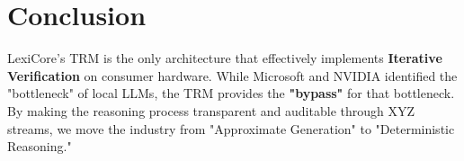 \documentclass[11pt]{article}
\begin{document}
\section{Conclusion}
LexiCore's TRM is the only architecture that effectively implements \textbf{Iterative Verification} on consumer hardware. While Microsoft and NVIDIA identified the "bottleneck" of local LLMs, the TRM provides the \textbf{"bypass"} for that bottleneck. By making the reasoning process transparent and auditable through XYZ streams, we move the industry from "Approximate Generation" to "Deterministic Reasoning."
\end{document}
